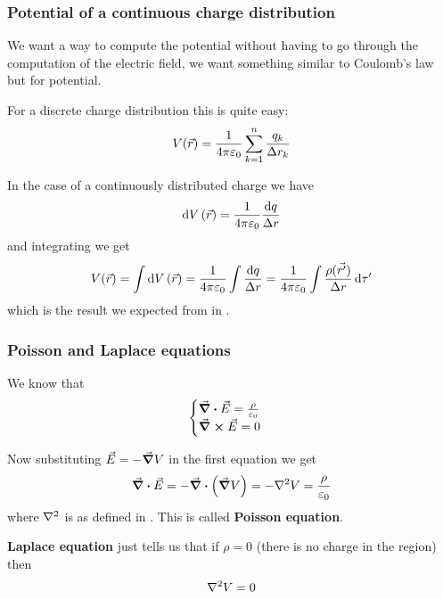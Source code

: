 \documentclass[12pt]{extarticle}
\begin{document}
\subsubsection{Potential of a continuous charge distribution}

We want a way to compute the potential without having to go through the computation of the electric field, we want something similar to Coulomb's law but for potential.

For a discrete charge distribution this is quite easy:
\begin{equation}
	V(\vec r) = \frac{1}{4 \pi \varepsilon_0} \sum_{k = 1}^n \frac{q_k}{\Delta r_k}
\end{equation}

In the case of a continuously distributed charge we have
\begin{equation}
	\dd{V}(\vec r) = \frac{1}{4 \pi \varepsilon_0} \frac{\dd{q}}{\Delta r}
\end{equation}
and integrating we get
\begin{equation}
	V(\vec r) = \int \dd{V}(\vec r) = \frac{1}{4 \pi \varepsilon_0} \int \frac{\dd{q}}{\Delta r} = \frac{1}{4 \pi \varepsilon_0} \int \frac{\rho(\vec {r'})}{\Delta r} \dd{\tau '}
\end{equation}
which is the result we expected from  in .

\subsubsection{Poisson and Laplace equations}

We know that
\begin{equation}
	\begin{cases}
		\div \vec E = \frac{\rho}{\varepsilon_0} \\
		\curl \vec E = 0
	\end{cases}
\end{equation}

Now substituting $\vec E = - \grad V$ in the first equation we get
\begin{equation}
	\label{eq:poisson}
	\div \vec E = - \div (\grad V) = - \laplacian V = \frac{\rho}{\varepsilon_0}
\end{equation}
where $\laplacian{}$ is as defined in .
This is called \textbf{Poisson equation}.

\textbf{Laplace equation} just tells us that if $\rho = 0$ (there is no charge in the region) then
\begin{equation}
	\laplacian V = 0
\end{equation}
\end{document}
